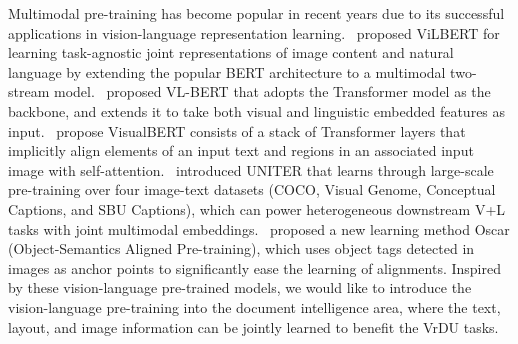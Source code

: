 \documentclass[11pt]{article}
\begin{document}
Multimodal pre-training has become popular in recent years due to its successful applications in vision-language representation learning.~\citet{lu2019vilbert} proposed ViLBERT for learning task-agnostic joint representations of image content and natural language by extending the popular BERT architecture to a multimodal two-stream model.~\citet{su2020vlbert} proposed VL-BERT that adopts the Transformer model as the backbone, and extends it to take both visual and linguistic embedded features as input.~\citet{li2019visualbert} propose VisualBERT consists of a stack of Transformer layers that implicitly align elements of an input text and regions in an associated input image with self-attention.~\citet{chen2020uniter} introduced UNITER that learns through large-scale pre-training over four image-text datasets (COCO, Visual Genome, Conceptual Captions, and SBU Captions), which can power heterogeneous downstream V+L tasks with joint multimodal embeddings.~\citet{li2020oscar} proposed a new learning method Oscar (Object-Semantics Aligned Pre-training), which uses object tags detected in images as anchor points to significantly ease the learning of alignments. Inspired by these vision-language pre-trained models, we would like to introduce the vision-language pre-training into the document intelligence area, where the text, layout, and image information can be jointly learned to benefit the VrDU tasks.
\end{document}

